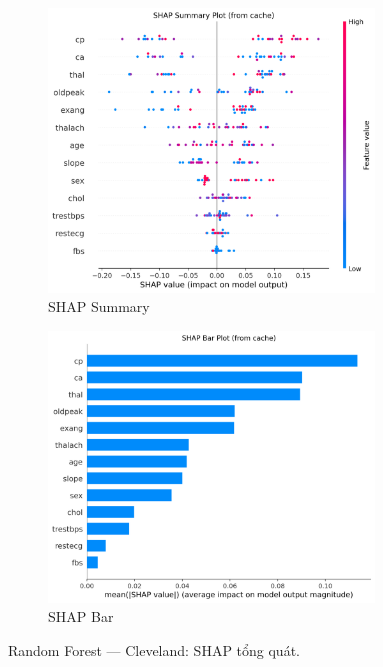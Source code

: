 \begin{figure}[H]
\centering
\begin{subfigure}[b]{0.48\textwidth}
\centering
\includegraphics[width=0.95\textwidth]{Result/cleveland_dataset/RF/SHAP/Summary.png}
\caption{SHAP Summary}
\label{fig:rf_clev_shap_summary}
\end{subfigure}\hfill
\begin{subfigure}[b]{0.48\textwidth}
\centering
\includegraphics[width=0.95\textwidth]{Result/cleveland_dataset/RF/SHAP/Bar.png}
\caption{SHAP Bar}
\label{fig:rf_clev_shap_bar}
\end{subfigure}
\caption{Random Forest — Cleveland: SHAP tổng quát.}
\label{fig:rf_clev_shap_overview}
\end{figure}

